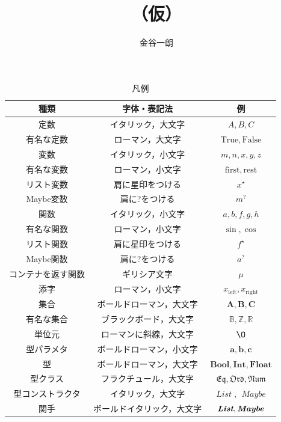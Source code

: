 \documentclass[a4paper]{jsbook}
\title{\haskell （仮）}
\author{金谷一朗}
\newcommand{\mSpecialConst}[1]{\mathrm{#1}} %
\newcommand{\mTrue}{\mSpecialConst{True}}
\newcommand{\mFalse}{\mSpecialConst{False}}
\newcommand{\mZero}{\O}
\newcommand{\mSpecialVar}[1]{\mathrm{#1}} %
\newcommand{\mFirstVar}{\mSpecialVar{first}}
\newcommand{\mRestVar}{\mSpecialVar{rest}}
\newcommand{\mSpecialSub}[1]{\text{#1}}
\newcommand{\mLeft}{\mSpecialSub{left}}
\newcommand{\mRight}{\mSpecialSub{right}}
\newcommand{\mSet}[1]{\mathbf{#1}}
\newcommand{\mSpecialSet}[1]{\mathbb{#1}} %
\newcommand{\mRSet}{\mSpecialSet{R}}
\newcommand{\mZSet}{\mSpecialSet{Z}}
\newcommand{\mBSet}{\mSpecialSet{B}}
\newcommand{\mTypeParameter}[1]{\mathbf{#1}}
\newcommand{\mType}[1]{\mathbf{#1}}
\newcommand{\mBoolType}{\mType{Bool}}
\newcommand{\mIntType}{\mType{Int}}
\newcommand{\mFloatType}{\mType{Float}}
\newcommand{\mFunctor}[1]{\textit{\textbf{#1}}}
\newcommand{\mTypeConstructor}[1]{\mathit{#1}} %
\newcommand{\mSpecialTypeClass}[1]{\mathfrak{#1}} %
\newcommand{\mEqTypeClass}{\mSpecialTypeClass{Eq}}
\newcommand{\mOrdTypeClass}{\mSpecialTypeClass{Ord}}
\newcommand{\mNumTypeClass}{\mSpecialTypeClass{Num}}
\newcommand{\mList}[1]{{#1}^\mathrm{\star}}
\newcommand{\mMaybe}[1]{{#1}^\text{?}}
\newcommand{\mMonadFunc}[1]{#1}%
\DeclareMathOperator{\mListTypeConstructor}{\mTypeConstructor{List}}
\DeclareMathOperator{\mMaybeTypeConstructor}{\mTypeConstructor{Maybe}}
\newcommand{\mathVarKeyword}[1]{\operatorname{\mathrm{#1}}}
\newcommand{\mFirstVar}{\mathVarKeyword{first}}
\begin{document}
\setlength{\baselineskip}{17pt}
\maketitle
\tableofcontents

\begin{table}
\caption{凡例}
\begin{center}
\begin{tabular}{||c|c|c||}
\hline
種類&字体・表記法&例\\
\hline\hline
定数&イタリック，大文字&$A,B,C$\\
有名な定数&ローマン，大文字&$\mTrue,\mFalse$\\
\hline
変数&イタリック，小文字&$m,n,x,y,z$\\
有名な変数&ローマン，小文字&$\mFirstVar,\mRestVar$\\
リスト変数&肩に星印をつける&$\mList{x}$\\
Maybe変数&肩に?をつける&$\mMaybe{m}$\\
\hline
関数&イタリック，小文字&$a,b,f,g,h$\\
有名な関数&ローマン，小文字&$\sin,\cos$\\
リスト関数&肩に星印をつける&$\mList{f}$\\
Maybe関数&肩に?をつける&$\mMaybe{a}$\\
コンテナを返す関数&ギリシア文字&$\mMonadFunc{\mu}$\\
\hline
添字&ローマン，小文字&$x_\mLeft,x_\mRight$\\
\hline
集合&ボールドローマン，大文字&$\mSet{A},\mSet{B},\mSet{C}$\\
有名な集合&ブラックボード，大文字&$\mBSet,\mZSet,\mRSet$\\
単位元&ローマンに斜線，大文字&$\mZero$\\
\hline
型パラメタ&ボールドローマン，小文字&$\mTypeParameter{a},\mTypeParameter{b},\mTypeParameter{c}$\\
型&ボールドローマン，大文字&$\mBoolType,\mIntType,\mFloatType$\\
型クラス&フラクチュール，大文字&$\mEqTypeClass,\mOrdTypeClass,\mNumTypeClass$\\
\hline
型コンストラクタ&イタリック，大文字&$\mListTypeConstructor$, $\mMaybeTypeConstructor$\\
関手&ボールドイタリック，大文字&$\mFunctor{List},\mFunctor{Maybe}$\\

\end{tabular}
\end{center}
\end{table}
\end{document}
